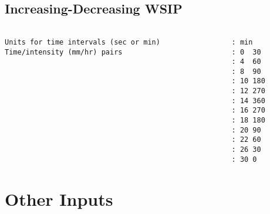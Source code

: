 \subsection{Increasing-Decreasing WSIP}

\begin{verbatim}

Units for time intervals (sec or min)                 : min
Time/intensity (mm/hr) pairs                          : 0  30
                                                      : 4  60
                                                      : 8  90
                                                      : 10 180
                                                      : 12 270
                                                      : 14 360
                                                      : 16 270
                                                      : 18 180
                                                      : 20 90
                                                      : 22 60
                                                      : 26 30
                                                      : 30 0

\end{verbatim}

\section{Other Inputs}

